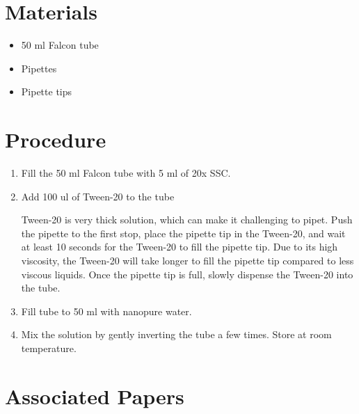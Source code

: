 \documentclass[
  letterpaper,
  DIV=11,
  numbers=noendperiod]{scrreprt}
\providecommand{\tightlist}{%
  \setlength{\itemsep}{0pt}\setlength{\parskip}{0pt}}\usepackage{longtable,booktabs,array}
\begin{document}
\hypertarget{materials-99}{%
\section{Materials}\label{materials-99}}

\begin{itemize}
\tightlist
\item
  50 ml Falcon tube
\item
  Pipettes
\item
  Pipette tips
\end{itemize}

\hypertarget{procedure-98}{%
\section{Procedure}\label{procedure-98}}

\begin{enumerate}
\def\labelenumi{\arabic{enumi}.}
\item
  Fill the 50 ml Falcon tube with 5 ml of 20x SSC.
\item
  Add 100 ul of Tween-20 to the tube

  \begin{tcolorbox}[enhanced jigsaw, rightrule=.15mm, title=\textcolor{quarto-callout-important-color}{\faExclamation}\hspace{0.5em}{NOTE}, titlerule=0mm, opacitybacktitle=0.6, toprule=.15mm, bottomrule=.15mm, opacityback=0, left=2mm, colframe=quarto-callout-important-color-frame, breakable, coltitle=black, colback=white, colbacktitle=quarto-callout-important-color!10!white, bottomtitle=1mm, leftrule=.75mm, toptitle=1mm, arc=.35mm]

  Tween-20 is very thick solution, which can make it challenging to
  pipet. Push the pipette to the first stop, place the pipette tip in
  the Tween-20, and wait at least 10 seconds for the Tween-20 to fill
  the pipette tip. Due to its high viscosity, the Tween-20 will take
  longer to fill the pipette tip compared to less viscous liquids. Once
  the pipette tip is full, slowly dispense the Tween-20 into the tube.

  \end{tcolorbox}
\item
  Fill tube to 50 ml with nanopure water.
\item
  Mix the solution by gently inverting the tube a few times. Store at
  room temperature.
\end{enumerate}

\hypertarget{associated-papers-73}{%
\section{Associated Papers}\label{associated-papers-73}}
\end{document}
